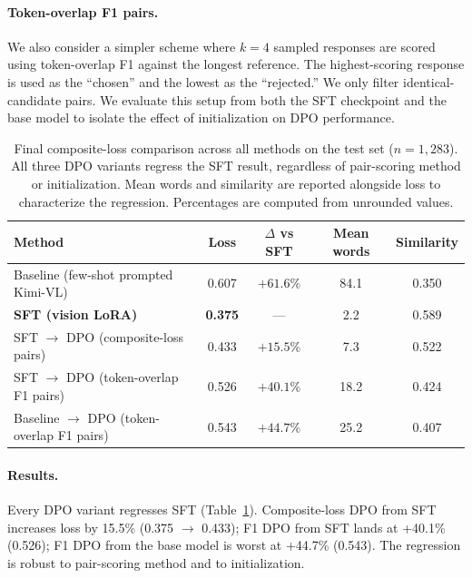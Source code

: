 \documentclass{article}
\begin{document}
\paragraph{Token-overlap F1 pairs.}
We also consider a simpler scheme where $k = 4$ sampled responses are scored using token-overlap F1 against the longest reference. The highest-scoring response is used as the ``chosen'' and the lowest as the ``rejected.'' We only filter identical-candidate pairs. We evaluate this setup from both the SFT checkpoint and the base model to isolate the effect of initialization on DPO performance.

\begin{table}[H]
\centering
\caption{Final composite-loss comparison across all methods on the test set ($n = 1{,}283$). All three DPO variants regress the SFT result, regardless of pair-scoring method or initialization. Mean words and similarity are reported alongside loss to characterize the regression. Percentages are computed from unrounded values.}
\label{tab:final}
\begin{tabular}{lcccc}
\toprule
\textbf{Method} & \textbf{Loss} & \textbf{$\Delta$ vs SFT} & \textbf{Mean words} & \textbf{Similarity} \\
\midrule
Baseline (few-shot prompted Kimi-VL)        & 0.607 & $+61.6\%$ & 84.1 & 0.350 \\
\textbf{SFT (vision LoRA)}                  & \textbf{0.375} & ---       &  2.2 & 0.589 \\
SFT $\to$ DPO (composite-loss pairs)        & 0.433 & $+15.5\%$ &  7.3 & 0.522 \\
SFT $\to$ DPO (token-overlap F1 pairs)      & 0.526 & $+40.1\%$ & 18.2 & 0.424 \\
Baseline $\to$ DPO (token-overlap F1 pairs) & 0.543 & $+44.7\%$ & 25.2 & 0.407 \\
\bottomrule
\end{tabular}
\end{table}

\paragraph{Results.}
Every DPO variant regresses SFT (Table~\ref{tab:final}). Composite-loss DPO from SFT increases loss by 15.5\% (0.375 $\to$ 0.433); F1 DPO from SFT lands at +40.1\% (0.526); F1 DPO from the base model is worst at +44.7\% (0.543). The regression is robust to pair-scoring method and to initialization.
\end{document}
